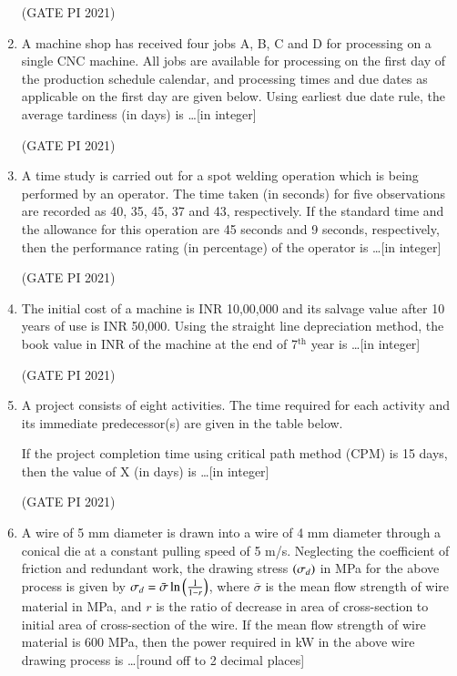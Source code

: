 \documentclass[journal,12pt,onecolumn]{IEEEtran}
\theoremstyle{remark}
\begin{document}
\begin{enumerate}
\hfill (GATE PI 2021)

\item
A machine shop has received four jobs A, B, C and D for processing on a single CNC machine. All jobs are available for processing on the first day of the production schedule calendar, and processing times and due dates as applicable on the first day are given below. Using earliest due date rule, the average tardiness (in days) is \dots [in integer]



\hfill (GATE PI 2021)

\item
A time study is carried out for a spot welding operation which is being performed by an operator. The time taken (in seconds) for five observations are recorded as 40, 35, 45, 37 and 43, respectively. If the standard time and the allowance for this operation are 45 seconds and 9 seconds, respectively, then the performance rating (in percentage) of the operator is \dots [in integer]

\hfill (GATE PI 2021)

\item
The initial cost of a machine is INR 10,00,000 and its salvage value after 10 years of use is INR 50,000. Using the straight line depreciation method, the book value in INR of the machine at the end of 7$^\mathrm{th}$ year is \dots [in integer]

\hfill (GATE PI 2021)

\item
A project consists of eight activities. The time required for each activity and its immediate predecessor(s) are given in the table below.



If the project completion time using critical path method (CPM) is 15 days, then the value of X (in days) is \dots [in integer]

\hfill (GATE PI 2021)

\item
A wire of 5 mm diameter is drawn into a wire of 4 mm diameter through a conical die at a constant pulling speed of 5 m/s. Neglecting the coefficient of friction and redundant work, the drawing stress $\left(\sigma_d\right)$ in MPa for the above process is given by $\sigma_d = \bar{\sigma} \ln \left(\frac{1}{1-r}\right)$, where $\bar{\sigma}$ is the mean flow strength of wire material in MPa, and $r$ is the ratio of decrease in area of cross-section to initial area of cross-section of the wire. If the mean flow strength of wire material is 600 MPa, then the power required in kW in the above wire drawing process is \dots [round off to 2 decimal places]


\end{enumerate}
\end{document}
